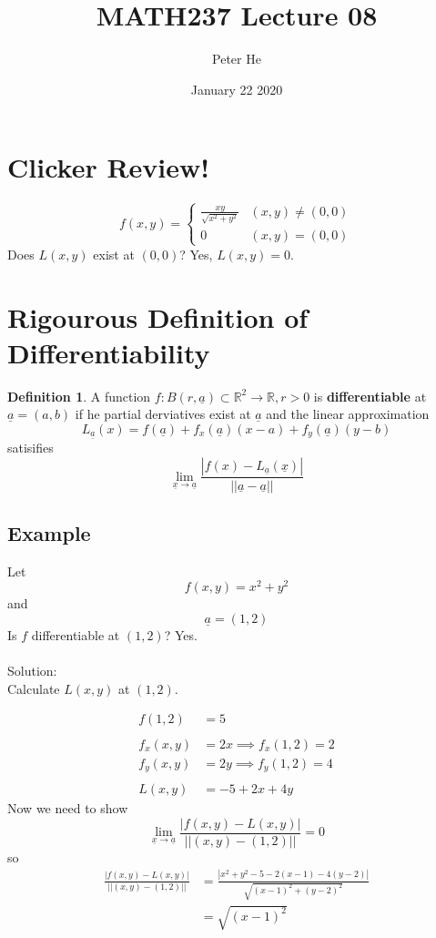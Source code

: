 \documentclass[12pt]{article}
\title{MATH237 Lecture 08}
\author{Peter He}
\date{January 22 2020}
\theoremstyle{definition}
\newtheorem{definition}{Definition}[section]
\newcommand{\R}{\mathbb{R}}
\begin{document}
\maketitle

\section{Clicker Review!}
\[f(x,y)=\begin{cases}\frac{xy}{\sqrt{x^2+y^2}}&(x,y)\neq(0,0)\\0&(x,y)=(0,0)\end{cases}\]
Does $L(x,y)$ exist at $(0,0)$? Yes, $L(x,y)=0$.

\section{Rigourous Definition of Differentiability}

\begin{definition}
    A function $f:B(r,\underline a)\subset\R^2\to\R, r>0$ is \textbf{differentiable} at $\underline a=(a,b)$ if he partial derviatives exist at $\underline a$ and the linear approximation \[L_{\underline a}(x)=f(\underline a)+f_x(\underline a)(x-a)+f_y(\underline a)(y-b)\] satisifies \[\lim_{\underline x\to\underline a}\frac{|f(x)-L_{\underline a}(\underline x)|}{||\underline a-\underline a||}\]
\end{definition}

\subsection{Example}
Let \[f(x,y)=x^2+y^2\] and \[\underline a=(1,2)\] Is $f$ differentiable at $(1,2)$? Yes.\\\\
Solution:\\
Calculate $L(x,y)$ at $(1,2)$. 

\begin{align*}
    f(1,2)&=5\\\\
    f_x(x,y)&=2x\implies f_x(1,2)=2\\
    f_y(x,y)&=2y\implies f_y(1,2)=4\\\\
    L(x,y)&=-5+2x+4y
\end{align*}
Now we need to show \[\lim_{\underline x\to\underline a}\frac{|f(x,y)-L(x,y)|}{||(x,y)-(1,2)||}=0\] so 
\begin{align*}
    \frac{|f(x,y)-L(x,y)|}{||(x,y)-(1,2)||}&=\frac{|x^2+y^2-5-2(x-1)-4(y-2)|}{\sqrt{(x-1)^2+(y-2)^2}}\\
    &=\sqrt{(x-1)^2}
\end{align*}
\end{document}
